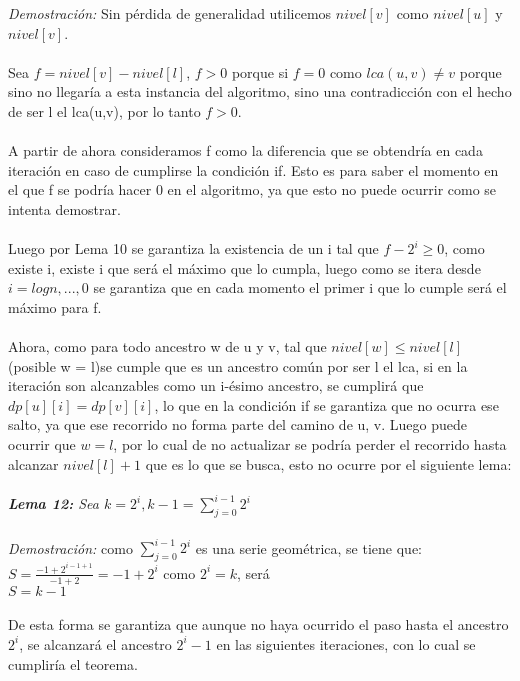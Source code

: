 \documentclass[12pt]{article}
\begin{document}
\textit{Demostración:} Sin p\'erdida de generalidad utilicemos $nivel [v]$ como $nivel [u]$ y $nivel [v]$.\\
\\
Sea $f = nivel [v] - nivel [l]$, $f > 0$ porque si $f = 0$ como $lca(u, v) \neq v$ porque sino no llegar\'ia a esta instancia del algoritmo, sino una contradicci\'on con el hecho de ser l el lca(u,v), por lo tanto $f > 0$.\\
\\
A partir de ahora consideramos f como la diferencia que se obtendr\'ia en cada iteraci\'on en caso de cumplirse la condici\'on if. Esto es para saber el momento en el que f se podr\'ia hacer 0  en el algoritmo, ya que esto no puede ocurrir como se intenta demostrar.\\
\\
Luego por Lema 10 se garantiza la existencia de un i tal que $f - 2^i \geq 0$, como existe i, existe i que ser\'a el m\'aximo que lo cumpla, luego como se itera desde $i = log n, ..., 0$ se garantiza que en cada momento el primer i que lo cumple ser\'a el m\'aximo para f.\\
\\
Ahora, como para todo ancestro w de u y v, tal que $nivel [w] \leq nivel [l]$  (posible w = l)se cumple que es un ancestro com\'un por ser l el lca, si en la iteraci\'on son alcanzables como un i-\'esimo ancestro, se cumplir\'a que $dp [u] [i] = dp[v] [i]$, lo que en la condici\'on if se garantiza que no ocurra ese salto, ya que ese recorrido no forma parte del camino de u, v.  Luego puede ocurrir que $w = l$,  por lo cual de no actualizar se podr\'ia perder el recorrido hasta alcanzar $nivel [l] + 1$ que es lo que se busca, esto no ocurre por el siguiente lema: \\
\\
\textit{ \textbf{Lema 12:} Sea $k = 2^i,  k-1 = \sum\limits_{j=0}^{i-1}2^i$}\\
\\
\textit{Demostración:} como $ \sum\limits_{j=0}^{i-1}2^i$ es una serie geom\'etrica, se tiene que:
\\
$S = \frac{-1+2^{i-1+1}}{-1+2} = -1 + 2^i$  como $2^i = k$, ser\'a \\
$S =   k - 1$\\
\\                                                                        
De esta forma se garantiza que  aunque no haya ocurrido el paso hasta el ancestro $2^i$, se alcanzar\'a el ancestro $2^i - 1$ en las siguientes iteraciones, con 
lo cual se cumplir\'ia el teorema.
\end{document}
